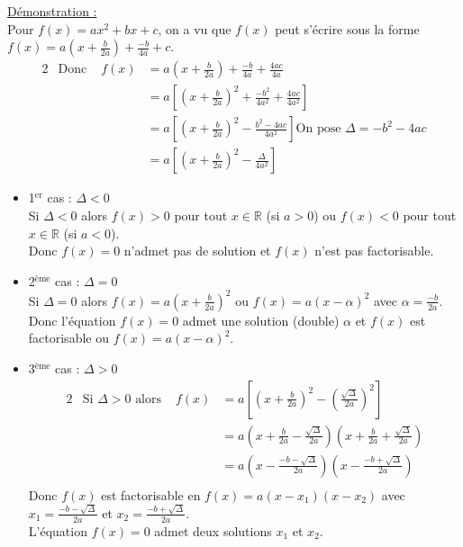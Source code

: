 \documentclass[11pt,a4paper]{article}
\begin{document}
\underline{Démonstration :} \\

Pour $f(x)=ax^2+bx+c$, on a vu que $f(x)$ peut s'écrire sous la forme $f(x)=a(x+\frac{b}{2a})+\frac{-b}{4a}+c$.
\begin{alignat*}{2}
     & \text{Donc } & f(x) & = a\left(x+\frac{b}{2a}\right)+\frac{-b}{4a}+\frac{4ac}{4a}                                         \\
     &              &      & = a\left[\left(x+\frac{b}{2a}\right)^2+\frac{-b^2}{4a^2}+\frac{4ac}{4a^2}\right]                    \\
     &              &      & = a\left[\left(x+\frac{b}{2a}\right)^2-\frac{b^2-4ac}{4a^2}\right] \text{On pose $\Delta=-b^2-4ac$} \\
     &              &      & = a\left[\left(x+\frac{b}{2a}\right)^2-\frac{\Delta}{4a^2}\right]
\end{alignat*}

\begin{itemize}
    \item 1$^{\text{er}}$ cas : $\Delta<0$ ~\\
          Si $\Delta<0$ alors $f(x)>0$ pour tout $x\in\mathbb{R}$ (si $a>0$) ou $f(x)<0$ pour tout $x\in\mathbb{R}$ (si $a<0$). \\
          Donc $f(x)=0$ n'admet pas de solution et $f(x)$ n'est pas factorisable.

    \item 2$^{\text{ème}}$ cas : $\Delta=0$ \\
          Si $\Delta=0$ alors $f(x)=a( x+\frac{b}{2a})^2$ ou $f(x)=a(x-\alpha)^2$ avec $\alpha=\frac{-b}{2a}$. \\
          Donc l'équation $f(x)=0$ admet une solution (double) $\alpha$ et $f(x)$ est factorisable ou $f(x)=a(x-\alpha)^2$.

    \item 3$^{\text{ème}}$ cas : $\Delta>0$
          \begin{alignat*}{2}
               & \text{Si $\Delta>0$ alors } & f(x) & = a\left[\left(x+\frac{b}{2a}\right)^2-\left(\frac{\sqrt{\Delta}}{2a}\right)^2\right]                      \\
               &                                   &      & =a\left(x+\frac{b}{2a}-\frac{\sqrt{\Delta}}{2a}\right)\left(x+\frac{b}{2a}+\frac{\sqrt{\Delta}}{2a}\right) \\
               &                                   &      & =a\left(x-\frac{-b-\sqrt{\Delta}}{2a}\right)\left(x-\frac{-b+\sqrt{\Delta}}{2a}\right)                     \\
          \end{alignat*}
          Donc $f(x)$ est factorisable en $f(x)=a(x-x_1)(x-x_2)$ avec $x_1=\frac{-b-\sqrt{\Delta}}{2a}$ et $x_2=\frac{-b+\sqrt{\Delta}}{2a}$. \\
          L'équation $f(x)=0$ admet deux solutions $x_1$ et $x_2$.
\end{itemize}
\end{document}

